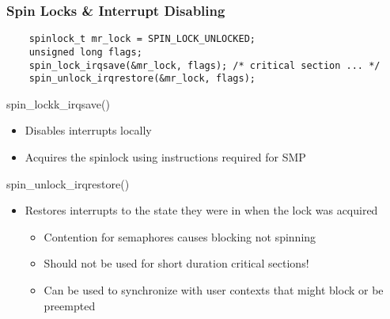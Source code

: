\begin{frame}[fragile]
    \frametitle{Spin Locks \& Interrupt Disabling}
    \large    
    \begin{block}{}
        \begin{verbatim}
    spinlock_t mr_lock = SPIN_LOCK_UNLOCKED;
    unsigned long flags;
    spin_lock_irqsave(&mr_lock, flags); /* critical section ... */
    spin_unlock_irqrestore(&mr_lock, flags);
\end{verbatim}
    \end{block}        
    
    \Large
    spin\_lockk\_irqsave()
    \begin{itemize}
        \item Disables interrupts locally
        \item Acquires the spinlock using instructions required for SMP
    \end{itemize}    
    spin\_unlock\_irqrestore()
    \begin{itemize}
        \item Restores interrupts to the state they were in when the
        lock was acquired\large
        \begin{itemize}
            \item Contention for semaphores causes blocking not spinning
            \item Should not be used for short duration critical sections!
            \item Can be used to synchronize with user contexts that
            might block or be preempted
        \end{itemize}  
    \end{itemize} 
    
\end{frame}


